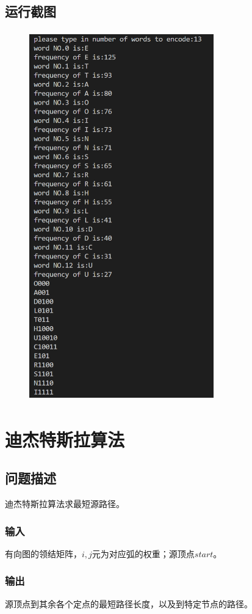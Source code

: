 \documentclass{ctexart}[UTF8]
\begin{document}
    \subsection{运行截图}
    \begin{figure}[H]
        \centering
        \includegraphics[width=8cm,height=16cm]{../Resources/10_1.png}
    \end{figure}
    
    \section{迪杰特斯拉算法}
    \subsection{问题描述}
    迪杰特斯拉算法求最短源路径。
    \subsubsection{输入}
    有向图的领结矩阵，$i,j$元为对应弧的权重；源顶点$start$。
    \subsubsection{输出}
    源顶点到其余各个定点的最短路径长度，以及到特定节点的路径。
\end{document}
